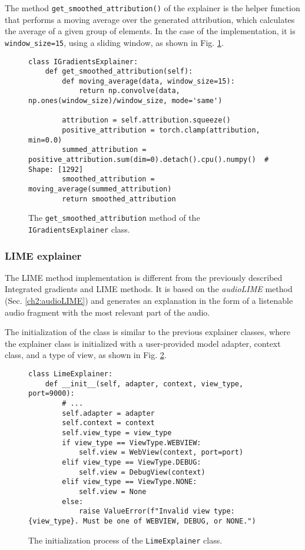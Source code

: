 \documentclass[
    bindingoffset=5mm,  %
    footnoteindent=3mm, %
    hyphenation=true    %
]{src/wut-thesis}
\begin{document}
The method \texttt{get_smoothed_attribution()} of the explainer is the helper
function that performs a moving average over the generated attribution, which calculates
the average of a given group of elements. In the case of the implementation,
it is \texttt{window_size=15}, using a sliding window, as shown in Fig. \ref{fig:get_smoothed_attribution}.

\begin{figure}[h!]
\begin{verbatim}
class IGradientsExplainer:
    def get_smoothed_attribution(self):
        def moving_average(data, window_size=15):
            return np.convolve(data, np.ones(window_size)/window_size, mode='same')

        attribution = self.attribution.squeeze()
        positive_attribution = torch.clamp(attribution, min=0.0)
        summed_attribution = positive_attribution.sum(dim=0).detach().cpu().numpy()  # Shape: [1292]
        smoothed_attribution = moving_average(summed_attribution)
        return smoothed_attribution
\end{verbatim}
\caption{The \texttt{get\_smoothed\_attribution} method of the \texttt{IGradientsExplainer} class.}
\label{fig:get_smoothed_attribution}
\end{figure}

\subsubsection{LIME explainer}

The LIME method implementation is different from the previously described Integrated gradients and
LIME methods. It is based on the \emph{audioLIME} method (Sec. \ref{ch2:audioLIME}) and generates
an explanation in the form of a listenable audio fragment with the most relevant part of the audio.

The initialization of the class is similar to the previous explainer classes, where the explainer
class is initialized with a user-provided model adapter, context class, and a type of view,
as shown in Fig. \ref{fig:LimeMethodInit}.

\begin{figure}[h!]
\begin{verbatim}
class LimeExplainer:
    def __init__(self, adapter, context, view_type, port=9000):
        # ...
        self.adapter = adapter
        self.context = context
        self.view_type = view_type
        if view_type == ViewType.WEBVIEW:
            self.view = WebView(context, port=port)
        elif view_type == ViewType.DEBUG:
            self.view = DebugView(context)
        elif view_type == ViewType.NONE:
            self.view = None
        else:
            raise ValueError(f"Invalid view type: {view_type}. Must be one of WEBVIEW, DEBUG, or NONE.")
\end{verbatim}
\caption{The initialization process of the \texttt{LimeExplainer} class.}
\label{fig:LimeMethodInit}
\end{figure}
\end{document}
